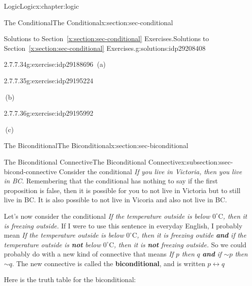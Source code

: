 \documentclass[twoside,10pt,]{book}
\newcommand{\xreffont}{\relax}
\newcommand{\alert}[1]{\textbf{\textit{#1}}}
\newcommand{\terminology}[1]{\textbf{#1}}
\numberwithin{equation}{section}
\newcommand{\biconditional}{{p {\leftrightarrow}{} q}}
\begin{document}
\begin{chapterptx}{Logic}{}{Logic}{}{}{x:chapter:logic}
\begin{sectionptx}{The Conditional}{}{The Conditional}{}{}{x:section:sec-conditional}
\begin{solutions-subsection}{Solutions to Section~{\xreffont\ref*{x:section:sec-conditional}} Exercises.}{}{Solutions to Section~{\xreffont\ref*{x:section:sec-conditional}} Exercises.}{}{}{g:solutions:idp29208408}
\begin{divisionsolution}{2.7.7.34}{}{g:exercise:idp29188696}
\noindent\hypertarget{g:solution:idp29197912-main}{}\(\ \)(a)\end{divisionsolution}%
\begin{divisionsolution}{2.7.7.35}{}{g:exercise:idp29195224}%
\par\smallskip%
\noindent\hypertarget{g:solution:idp29198552-main}{}\(\ \)(b)\end{divisionsolution}%
\begin{divisionsolution}{2.7.7.36}{}{g:exercise:idp29195992}%
\par\smallskip%
\noindent\hypertarget{g:solution:idp29210072-main}{}\(\ \)(c)\end{divisionsolution}%
\end{solutions-subsection}
\end{sectionptx}
%
%
\typeout{************************************************}
\typeout{************************************************}
%
\begin{sectionptx}{The Biconditional}{}{The Biconditional}{}{}{x:section:sec-biconditional}
%
%
\typeout{************************************************}
\typeout{************************************************}
%
\begin{subsectionptx}{The Biconditional Connective}{}{The Biconditional Connective}{}{}{x:subsection:ssec-bicond-connective}
Consider the conditional \emph{If you live in Victoria, then you live in BC.}  Remembering that the conditional has nothing to say if the first proposition is false, then it is possible for you to not live in Victoria but to still live in BC.  It is also possible to not live in Vicoria and also not live in BC.%
\par
Let's now consider the conditional \emph{If the temperature outside is below \(0^{\circ}\text{C}\), then it is freezing outside.}  If I were to use this sentence in everyday English, I probably mean \emph{If the temperature outside is below \(0^{\circ}\text{C}\), then it is freezing outide \alert{and} if the temperature outside is \alert{not} below \(0^{\circ}\text{C}\), then it is \alert{not} freezing outside.}  So we could probably do with a new kind of connective that means \emph{If \(p\) then \(q\) \alert{and} if \(\sim\!{p}{}\) then \(\sim\!{q}{}\)}.  The new connective is called the \terminology{biconditional}, and is written \(\biconditional\)%
\par
Here is the truth table for the biconditional: \begin{center}%

\end{center}
\end{subsectionptx}
\end{sectionptx}
\end{chapterptx}
\end{document}
